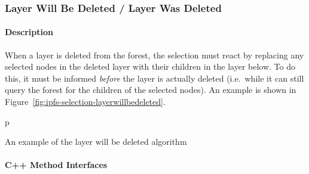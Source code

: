 \subsubsection{Layer Will Be Deleted / Layer Was Deleted}

\paragraph{Description}

When a layer is deleted from the forest, the selection must react by replacing any selected nodes in the deleted layer with their children in the layer below. To do this, it must be informed \emph{before} the layer is actually deleted (i.e.~while it can still query the forest for the children of the selected nodes). An example is shown in Figure~\ref{fig:ipfs-selection-layerwillbedeleted}.

\begin{stusubfig}{p}
	\hspace{4mm}%
\caption{An example of the layer will be deleted algorithm}
\label{fig:ipfs-selection-layerwillbedeleted}
\end{stusubfig}

\paragraph{C++ Method Interfaces}


